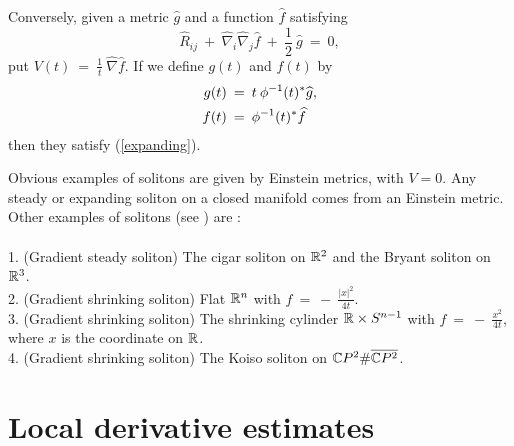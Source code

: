 Conversely, given a metric $\widehat{g}$ and a function $\widehat{f}$
satisfying
\begin{equation}
\widehat{R}_{ij} \: + \: \widehat{\nabla}_i \widehat{\nabla}_j \widehat{f}
\: + \: \frac{1}{2} \:
\widehat{g}
\: = \: 0,
\end{equation}
put $V(t) \: = \: \frac{1}{t} \: \widehat{\nabla} \widehat{f}$.
If we define $g(t)$ and $f(t)$ by
\begin{align}
g(t) \: & = \: t \: \phi^{-1}(t)^* \widehat{g}, \\
f(t) \: & = \: \phi^{-1}(t)^* \widehat{f} \notag
\end{align}
then they satisfy (\ref{expanding}).

Obvious examples of solitons are given by Einstein metrics, with
$V = 0$. Any steady or expanding soliton on a closed
manifold comes from an Einstein metric.  Other examples of solitons
(see \cite[Chapter 2]{Chow-Knopf})
are : \\ \\
1. (Gradient steady soliton) The cigar soliton on ${\mathbb R}^2$ and the Bryant soliton
on ${\mathbb R}^3$. \\
2. (Gradient shrinking soliton) Flat ${\mathbb R}^n$ with $f \: = \: - \:
\frac{|x|^2}{4t}$. \\
3. (Gradient shrinking soliton) The shrinking cylinder
${\mathbb R} \times S^{n-1}$ with
$f \: = \: - \: \frac{x^2}{4t}$, where $x$ is the coordinate on ${\mathbb R}$. \\
4. (Gradient shrinking soliton) The Koiso soliton on ${\mathbb C} P^2 \#
\overline{{\mathbb C} P^2}$.

\section{Local derivative estimates} \label{applocalder}

